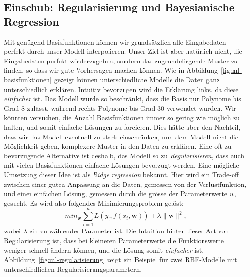 \subsection{Einschub: Regularisierung und Bayesianische Regression}

Mit genügend Basisfunktionen können wir grundsätzlich alle Eingabedaten perfekt durch unser Modell interpolieren. 
Unser Ziel ist aber natürlich nicht, die Eingabedaten perfekt wiederzugeben, sondern das 
zugrundeliegende Muster zu finden, so dass wir gute Vorhersagen machen können. Wie in Abbildung~\ref{fig:ml-basisfunktionen} gezeigt können unterschiedliche Modelle die Daten ganz unterschiedlich erklären. 
Intuitiv bevorzugen wird die Erklärung links, da diese \emph{einfacher} ist. Das Modell wurde so beschränkt, dass die Basis nur Polynome bis Grad 8 zulässt, während rechts Polynome bis Grad 30 verwendet wurden. Wir könnten versuchen, die Anzahl Basisfunktionen immer so gering wie möglich zu halten, und somit einfache Lösungen zu forcieren. Dies hätte aber den Nachteil, dass wir 
das Modell eventuell zu stark einschränken, und dem Modell nicht die Möglichkeit geben, 
komplexere Muster in den Daten zu erklären. Eine oft zu bevorzugende Alternative ist deshalb,
das Modell so zu \emph{Regularisieren}, dass auch mit vielen Basisfunktionen einfache 
Lösungen bevorzugt werden. Eine mögliche Umsetzung dieser Idee ist als \emph{Ridge regression} 
bekannt. Hier wird ein Trade-off zwischen einer guten Anpassung an die Daten, gemessen von der Verlustfunktion, und einer 
einfachen Lösung, gemessen durch die grösse der Parameterwerte $w$, gesucht. Es wird also folgendes Minimierungsproblem gelöst:
\[
min_{\textbf{w}} \sum_{i=1}^n L(y_i, f(x_i, \textbf{w})) + \lambda \lVert \textbf{w} \rVert^2,
\]
wobei $\lambda$ ein zu wählender Parameter ist. Die Intuition hinter dieser Art von Regularisierung ist, 
dass bei kleineren Parameterwerte die Funktionswerte weniger schnell ändern können, 
und die Lösung somit \emph{einfacher} ist. Abbildung~\ref{fig:ml-regularisierung} zeigt
ein Beispiel für zwei RBF-Modelle mit unterschiedlichen Regularisierungsparametern.

